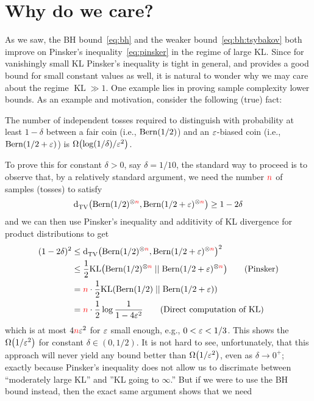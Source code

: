 \documentclass[10pt]{article}
\begin{document}
\section{Why do we care?}
  \label{sec:applications}
As we saw, the BH bound~\eqref{eq:bh} and the weaker bound~\eqref{eq:bh:tsybakov} both improve on Pinsker's inequality~\eqref{eq:pinsker} in the regime of large KL. Since for vanishingly small KL Pinsker's inequality is tight in general, and provides a good bound for small constant values as well, it is natural to wonder why we may care about the regime $\operatorname{KL}\gg 1$. One example lies in proving sample complexity lower bounds. As an example and motivation, consider the following (true) fact:
\begin{fact}
  \label{fact:test:bernoulli}
  The number of independent tosses required to distinguish with probability at least $1-\delta$ between a fair coin (i.e., $\operatorname{Bern}( 1/2 ) $) and an $\varepsilon$-biased coin (i.e., $\operatorname{Bern}( 1/2+\varepsilon ) $) is $\bigOmega{\log(1/\delta)/\eps^2}$.
\end{fact}
To prove this for constant $\delta>0$, say $\delta=1/10$, the standard way to proceed is to observe that, by a relatively standard argument, we need the number ${\textcolor{red}{n}}$ of samples (tosses) to satisfy
\begin{equation}
    \totalvardist{\bernoulli{1/2}^{\otimes\ns}}{\bernoulli{1/2+\eps}^{\otimes\ns}} \geq 1-2\delta
\end{equation}
and we can then use Pinsker's inequality and additivity of KL divergence for product distributions to get
\begin{align*}
    (1-2\delta)^2 
    &\leq \totalvardist{\bernoulli{1/2}^{\otimes\ns}}{\bernoulli{1/2+\eps}^{\otimes\ns}}^2    \\
    &\leq \frac{1}{2}\kldiv{\bernoulli{1/2}^{\otimes\ns}}{\bernoulli{1/2+\eps}^{\otimes\ns}}  \tag{Pinsker}\\
    &= \ns\cdot \frac{1}{2}\kldiv{\bernoulli{1/2}}{\bernoulli{1/2+\eps}}  \\
    &= \ns\cdot \frac{1}{2}\log\frac{1}{1-4\eps^2}  \tag{Direct computation of KL}
\end{align*}
which is at most $4{\textcolor{red}{n}}\varepsilon^2$ for $\varepsilon$ small enough, e.g., $0<\varepsilon<1/3$. This shows the $\bigOmega{1/\eps^2}$ for constant $\delta\in(0,1/2)$. It is not hard to see, unfortunately, that this approach will never yield any bound better than $\bigOmega{1/\eps^2}$, even as $\delta\to 0^+$; exactly because Pinsker's inequality does not allow us to discrimate between ``moderately large KL'' and ''KL going to $\infty$.'' But if we were to use the BH bound instead, then the exact same argument shows that we need
\end{document}
